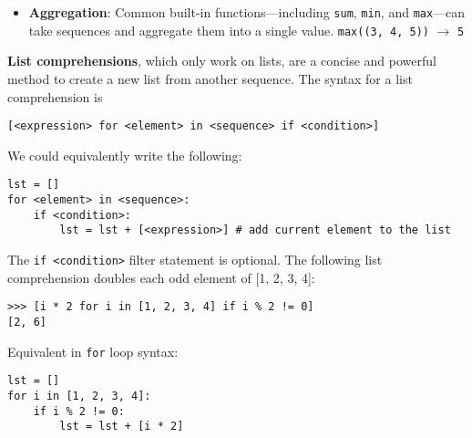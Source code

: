 \begin{itemize}
This evaluates to a new sequence that includes every element starting at \lstinline{<start index>} and up to and \textit{excluding} \lstinline{<end index>} in \lstinline{seq}, taking steps of size \lstinline{<step size>}. 

If we do not supply \lstinline{<start index>} or \lstinline{<end index>}, it will start at the beginning of the sequence and include every element up to and including the end of the sequence. 

\begin{lstlisting}
>>> lst = [1, 2, 3, 4, 5]
>>> lst[2:] 
[3, 4, 5]
>>> lst[:3] 
[1, 2, 3]
>>> lst[::-1] 
[5, 4, 3, 2, 1]
>>> lst[1::2] 
[2, 4]
\end{lstlisting}

\item \textbf{Aggregation}: Common built-in functions---including \lstinline{sum}, \lstinline{min}, and \lstinline{max}---can take sequences and aggregate them into a single value.
\lstinline{max((3, 4, 5))} $\rightarrow$ \lstinline{5}

\end{itemize}
\vspace{0.5 in}
\textbf{List comprehensions}, which only work on lists, are a concise and powerful method to create a new list from another sequence. The syntax for a list comprehension is
   \begin{lstlisting}
[<expression> for <element> in <sequence> if <condition>]
   \end{lstlisting}

\begin{blocksection}
We could equivalently write the following: 
\begin{lstlisting}
lst = []
for <element> in <sequence>:
	if <condition>:
		lst = lst + [<expression>] # add current element to the list
\end{lstlisting}
\end{blocksection}

\begin{blocksection}
The \lstinline{if <condition>} filter statement is optional. The following list comprehension doubles each odd element of [1, 2, 3, 4]:
\begin{lstlisting}
>>> [i * 2 for i in [1, 2, 3, 4] if i % 2 != 0] 
[2, 6]
\end{lstlisting}
\end{blocksection}

\begin{blocksection}
Equivalent in \lstinline{for} loop syntax:
\begin{lstlisting}
lst = []
for i in [1, 2, 3, 4]:
	if i % 2 != 0:
		lst = lst + [i * 2]
\end{lstlisting}
\end{blocksection}

